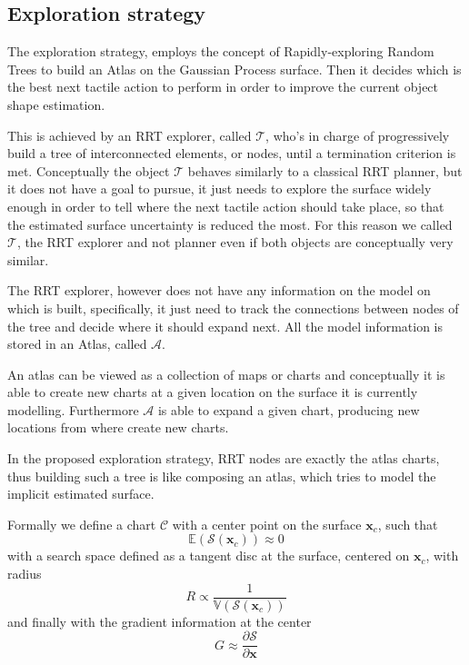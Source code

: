 \subsection{Exploration strategy}
\label{sec:strategy}

The exploration strategy, employs  the concept of Rapidly-exploring Random Trees to build
an Atlas on  the Gaussian Process surface. Then  it decides which
is  the  best next  tactile  action  to perform  in  order to improve the  current
object shape estimation.

This is achieved by an RRT explorer, called $\mathcal{T}$, who's in charge
of progressively build a tree of interconnected elements, or nodes,  until a termination criterion is met.
Conceptually the object $\mathcal{T}$ behaves similarly to a classical RRT planner,
but it does not have a goal to pursue, it just needs to explore the surface widely
enough in order to tell where the next tactile action should take place, so that
the estimated surface uncertainty is reduced the most.
For this reason we called $\mathcal{T}$, the RRT explorer and not planner even if
both objects are conceptually very similar.

The RRT explorer, however does not have any information on the model on which is built, specifically,
it just need to track the connections between nodes of the tree and decide where it
should expand next. All the model information is stored in an Atlas, called $\mathcal{A}$.

An atlas can be viewed as a collection of maps or charts and conceptually it is able
to create new charts at a given location on the surface it is currently modelling.
Furthermore $\mathcal{A}$ is able to expand a given chart, producing new locations
from where create new charts.

In the proposed exploration strategy, RRT nodes are exactly the atlas charts, thus
building such a tree is like composing an atlas, which tries to model the implicit
estimated surface.

Formally we define a chart $\mathcal{C}$ with a center point on the surface $\mathbf{x}_{c}$,
such that
$$
\mathbb{E}(\mathcal{S}(\mathbf{x}_c)) \approx 0
$$
with a search space defined as a
tangent disc at the surface, centered on $\mathbf{x}_c$, with radius 
$$
R \propto \frac{1}{\mathbb{V}(\mathcal{S}(\mathbf{x}_c))}
$$ 
and finally with the gradient information at the center 
$$
G \approx \frac{\partial \mathcal{S}}{\partial \mathbf{x}}
$$


